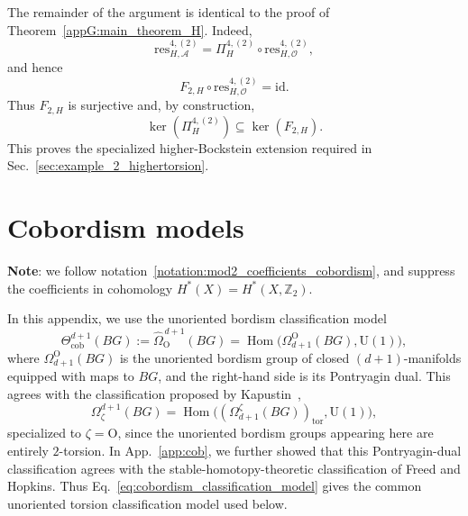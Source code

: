 \documentclass[aps,prx,reprint,superscriptaddress,twocolumn,amsmath,amssymb,amsfonts, nofootinbib]{revtex4-2}
\newcommand{\res}{\text{res}}
\newcommand{\Z}{\mathbb{Z}}
\theoremstyle{apsstyle}
\begin{document}
\noindent The remainder of the argument is identical to the proof of
Theorem~\ref{appG:main_theorem_H}. Indeed,
\begin{equation*}
\res_{H,\mathcal A}^{4,(2)}
=
\Pi_H^{4,(2)}
\circ
\res_{H,\mathcal O}^{4,(2)},
\end{equation*}
and hence
\begin{equation}
F_{2,H}
\circ
\res_{H,\mathcal O}^{4,(2)}
=
\mathrm{id}.
\label{eq:Z4Z4_specialized_section}
\end{equation}
Thus $F_{2,H}$ is surjective and, by construction,
\begin{equation}
\ker\left(\Pi_H^{4,(2)}\right)
\subseteq
\ker(F_{2,H}).
\label{eq:Z4Z4_specialized_kernel_inclusion}
\end{equation}
This proves the specialized higher-Bockstein extension required in Sec.~\ref{sec:example_2_highertorsion}.


\section{Cobordism models}
\label{app:cob_proof}

\noindent \textbf{Note}: we follow notation~\ref{notation:mod2_coefficients_cobordism}, and suppress the coefficients in cohomology $H^{*}(X)=H^{*}(X,\Z_{2})$.

\bigskip

\noindent In this appendix, we use the unoriented bordism classification model
\begin{equation}
    \Theta_{\mathrm{cob}}^{d+1}(BG)
    :=
    \widehat{\Omega}_{\mathrm O}^{\,d+1}(BG)
    =
    \operatorname{Hom}
    \bigl(
        \Omega_{d+1}^{\mathrm O}(BG),
        \mathrm U(1)
    \bigr),
    \label{eq:cobordism_classification_model}
\end{equation}
where $\Omega_{d+1}^{\mathrm O}(BG)$ is the unoriented bordism group
of closed $(d+1)$-manifolds equipped with maps to $BG$, and the
right-hand side is its Pontryagin dual. This agrees with the
classification proposed by Kapustin~\cite{Kapustin2014},
\begin{equation*}
    \Omega_{\zeta}^{d+1}(BG)
    =
    \operatorname{Hom}
    \bigl(
        (\Omega_{d+1}^{\zeta}(BG))_{\mathrm{tor}},
        \mathrm U(1)
    \bigr),
\end{equation*}
specialized to $\zeta=\mathrm O$, since the unoriented bordism groups
appearing here are entirely $2$-torsion. In
App.~\ref{app:cob}, we further showed that this Pontryagin-dual
classification agrees with the stable-homotopy-theoretic
classification of Freed and Hopkins. Thus
Eq.~\eqref{eq:cobordism_classification_model} gives the common
unoriented torsion classification model used below.
\end{document}
